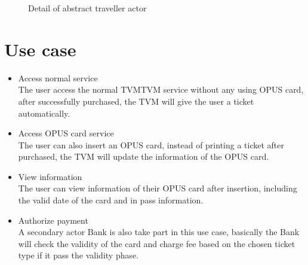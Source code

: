 \documentclass[12pt]{report}
\begin{document}
\begin{figure}[htb]
  \centering
  \caption{Detail of abstract traveller actor}
\end{figure}

\section{Use case}
\begin{itemize}
	\item Access normal service\\
	The user access the normal TVM\gls{TVM} service without any using OPUS card, after successfully purchased, the TVM will give the user a ticket automatically.
	\item Access OPUS card service\\
	The user can also insert an OPUS card, instead of printing a ticket after purchased, the TVM will update the information of the OPUS card.
	\item View information\\
	The user can view information of their OPUS card after insertion, including the valid date of the card and in pass information.
	\item Authorize payment\\
	A secondary actor Bank is also take part in this use case, basically the Bank will check the validity of the card and charge fee based on the chosen ticket type if it pass the validity phase.
\end{itemize}
\end{document}
